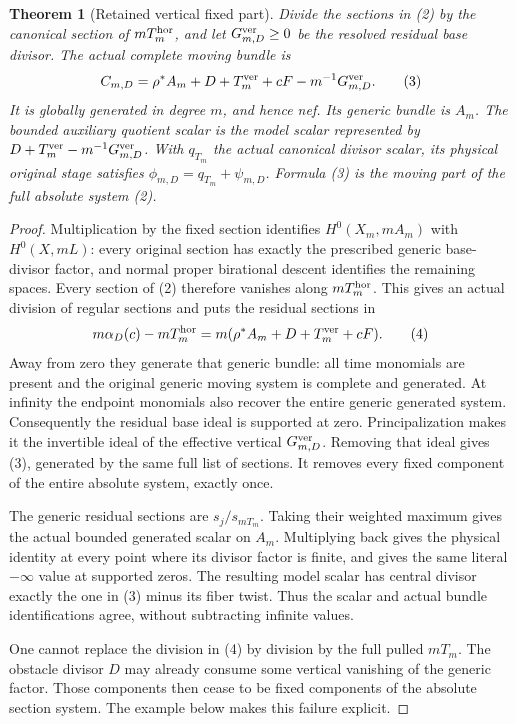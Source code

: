 \documentclass[11pt]{article}
\newtheorem{theorem}{Theorem}
\begin{document}
\begin{theorem}[Retained vertical fixed part]\label{formula}
Divide the sections in (2) by the canonical section of
$mT_m^{\rm hor}$, and let $G_{m,D}^{\rm ver}\geq0$ be the
resolved residual base divisor. The actual complete moving bundle is
\[
 C_{m,D}=\rho^*A_m+D+T_m^{\rm ver}+cF
                       -m^{-1}G_{m,D}^{\rm ver}.          \tag{3}
\]
It is globally generated in degree $m$, and hence nef. Its generic
bundle is $A_m$. The bounded auxiliary quotient scalar is the model
scalar represented by $D+T_m^{\rm ver}-m^{-1}G_{m,D}^{\rm ver}$.
With $q_{T_m}$ the actual canonical divisor scalar, its physical
original stage satisfies $\phi_{m,D}=q_{T_m}+\psi_{m,D}$.
Formula (3) is the moving part of the \emph{full} absolute system (2).
\end{theorem}
\begin{proof}
Multiplication by the fixed section identifies
$H^0(X_m,mA_m)$ with $H^0(X,mL)$: every original section has exactly
the prescribed generic base-divisor factor, and normal proper
birational descent identifies the remaining spaces. Every section of
(2) therefore vanishes along $mT_m^{\rm hor}$. This gives an actual
division of regular sections and puts the residual sections in
\[
 m\alpha_D(c)-mT_m^{\rm hor}
   =m(\rho^*A_m+D+T_m^{\rm ver}+cF).                      \tag{4}
\]
Away from zero they generate that generic bundle: all time monomials
are present and the original generic moving system is complete and
generated. At infinity the endpoint monomials also recover the entire
generic generated system. Consequently the residual base ideal is
supported at zero. Principalization makes it the invertible ideal of
the effective vertical $G_{m,D}^{\rm ver}$. Removing that ideal gives
(3), generated by the same full list of sections. It removes every
fixed component of the entire absolute system, exactly once.

The generic residual sections are $s_j/s_{mT_m}$. Taking their
weighted maximum gives the actual bounded generated scalar on $A_m$.
Multiplying back gives the physical identity at every point where its
divisor factor is finite, and gives the same literal $-\infty$ value
at supported zeros. The resulting model scalar has central divisor
exactly the one in (3) minus its fiber twist. Thus the scalar and actual
bundle identifications agree, without subtracting infinite values.

One cannot replace the division in (4) by division by the full pulled
$mT_m$. The obstacle divisor $D$ may already consume some vertical
vanishing of the generic factor. Those components then cease to be
fixed components of the absolute section system. The example below
makes this failure explicit.
\end{proof}
\end{document}
